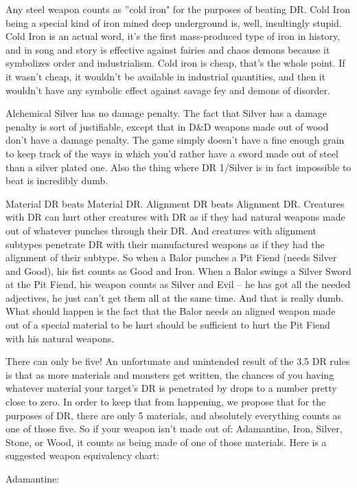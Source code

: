 \listone
\item Any steel weapon counts as ''cold iron" for the purposes of beating DR. Cold Iron being a special kind of iron mined deep underground is, well, insultingly stupid. Cold Iron is an actual word, it's the first mass-produced type of iron in history, and in song and story is effective against fairies and chaos demons because it symbolizes order and industrialism. Cold iron is cheap, that's the whole point. If it wasn't cheap, it wouldn't be available in industrial quantities, and then it wouldn't have any symbolic effect against savage fey and demons of disorder.
\item Alchemical Silver has no damage penalty. The fact that Silver has a damage penalty is sort of justifiable, except that in D\&D weapons made out of wood don't have a damage penalty. The game simply doesn't have a fine enough grain to keep track of the ways in which you'd rather have a sword made out of steel than a silver plated one. Also the thing where DR 1/Silver is in fact impossible to beat is incredibly dumb.
\item Material DR beats Material DR. Alignment DR beats Alignment DR. Creatures with DR can hurt other creatures with DR as if they had natural weapons made out of whatever punches through their DR. And creatures with alignment subtypes penetrate DR with their manufactured weapons as if they had the alignment of their subtype. So when a Balor punches a Pit Fiend (needs Silver and Good), his fist counts as Good and Iron. When a Balor swings a Silver Sword at the Pit Fiend, his weapon counts as Silver and Evil -- he has got all the needed adjectives, he just can't get them all at the same time. And that is really dumb. What should happen is the fact that the Balor needs an aligned weapon made out of a special material to be hurt should be sufficient to hurt the Pit Fiend with his natural weapons.
\item There can only be five! An unfortunate and unintended result of the 3.5 DR rules is that as more materials and monsters get written, the chances of you having whatever material your target's DR is penetrated by drops to a number pretty close to zero. In order to keep that from happening, we propose that for the purposes of DR, there are only 5 materials, and absolutely everything counts as one of those five. So if your weapon isn't made out of: Adamantine, Iron, Silver, Stone, or Wood, it counts as being made of one of those materials. Here is a suggested weapon equivalency chart:
\listtwo
    \item Adamantine: \listthree\small
